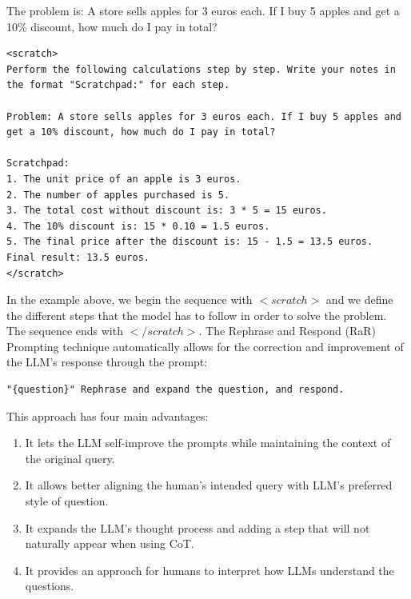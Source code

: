 The problem is: A store sells apples for 3 euros each. If I buy 5 apples and get a 10\% discount, how much do I pay in total?
\begin{lstlisting}
<scratch>
Perform the following calculations step by step. Write your notes in the format "Scratchpad:" for each step.

Problem: A store sells apples for 3 euros each. If I buy 5 apples and get a 10% discount, how much do I pay in total?

Scratchpad:
1. The unit price of an apple is 3 euros.
2. The number of apples purchased is 5.
3. The total cost without discount is: 3 * 5 = 15 euros.
4. The 10% discount is: 15 * 0.10 = 1.5 euros.
5. The final price after the discount is: 15 - 1.5 = 13.5 euros.
Final result: 13.5 euros.
</scratch>
\end{lstlisting}
In the example above, we begin the sequence with $<scratch>$ and we define the different steps that the model has to follow in order to solve the problem. The sequence ends with $</scratch>$.
The Rephrase and Respond (RaR) Prompting\cite{deng2023rephrase} technique automatically allows for the correction and improvement of the LLM's response through the prompt:
\begin{lstlisting}
"{question}" Rephrase and expand the question, and respond.
\end{lstlisting}
This approach has four main advantages:
\begin{enumerate}
    \item It lets the LLM self-improve the prompts while maintaining the context of the original query.

    \item It allows better aligning the human’s intended query with LLM’s preferred style of question.

    \item It expands the LLM’s thought process and adding a step that will not naturally appear when using CoT.

    \item It provides an approach for humans to interpret how LLMs understand the questions.
\end{enumerate}

